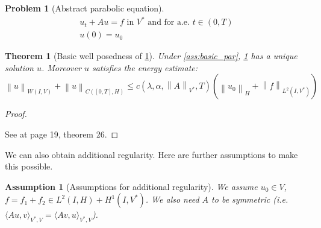\documentclass[english,a4paper,9pt,oneside]{scrbook}	%
\theoremstyle{break}
\newtheorem{thm}[equation]{Theorem}
\newtheorem{ass}[equation]{Assumption}
\newtheorem{pb}[equation]{Problem}
\newenvironment{mproof}[1][\proofname]{%
  \begin{proof}[#1]$ $\par\nobreak\ignorespaces
}{%
  \end{proof}
}
\renewcommand*{\proofname}{Proof}
\theoremstyle{remark}
\newcommand{\norm}[1]{\left\lVert#1\right\rVert}
\newcommand{\HN}[1]{\norm{#1}_{H}}
\newcommand{\VN}[1]{\norm{#1}_{V}}
\newcommand{\VSN}[1]{\norm{#1}_{V^*}}
\begin{document}
\begin{appendices}
\begin{pb}[Abstract parabolic equation]
\label{eqn:general_parabolic}
\begin{align}
	u_t+Au=f \text{ in }V^* \text{ and for a.e. } t \in (0,T)\\
	u(0)=u_0
\end{align}
\end{pb}

\begin{thm}[Basic well posedness of \cref{eqn:general_parabolic}]
\label{thm:well_pos_parabolic}
Under \cref{ass:basic_par}, \cref{eqn:general_parabolic} has a unique solution $u$. Moreover $u$ satisfies the energy estimate:
\begin{equation}
	\label{eqn:en_est}
	\norm{u}_{W(I,V)} + \norm{u}_{C([0,T],H)}\leq c(\lambda, \alpha, \VSN{A}, T)(\HN{u_0}+\norm{f}_{L^2(I,V^*)})
\end{equation} 
\end{thm}
\begin{mproof}
See \cite{gilardi} at page 19, theorem 26.
\end{mproof}

We can also obtain additional regularity. Here are further assumptions to make this possible.

\begin{ass}[Assumptions for additional regularity]
\label{ass:reg_par}
We assume $u_0 \in V$, $f = f_1+f_2 \in L^2(I,H)+H^1(I,V^*)$. We also need $A$ to be symmetric (i.e. $\langle Au,v \rangle_{V^*,V} = \langle Av,u \rangle_{V^*,V}$).
\end{ass}

%
% 
%
%


\end{appendices}
\end{document}
